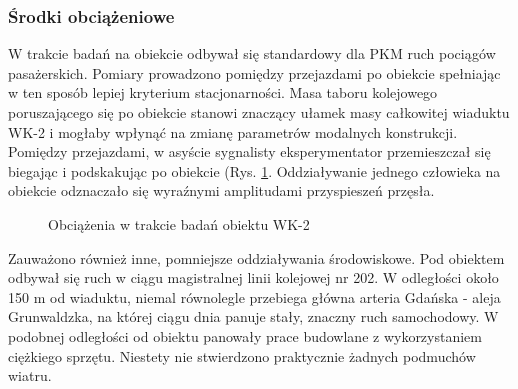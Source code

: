 \subsubsection{Środki obciążeniowe}
W trakcie badań na obiekcie odbywał się standardowy dla PKM ruch pociągów pasażerskich. Pomiary prowadzono pomiędzy przejazdami po obiekcie spełniając w ten sposób lepiej kryterium stacjonarności. Masa taboru kolejowego poruszającego się po obiekcie stanowi znaczący ułamek masy całkowitej wiaduktu WK-2 i mogłaby wpłynąć na zmianę parametrów modalnych konstrukcji. Pomiędzy przejazdami, w asyście sygnalisty eksperymentator przemieszczał się biegając i podskakując po obiekcie (Rys. \ref{fig: wk2_foto_obciazenia}. Oddziaływanie jednego człowieka na obiekcie odznaczało się wyraźnymi amplitudami przyspieszeń przęsła. 
\begin{figure}[hbt!]
	\centering
	 \quad
	\captionsetup{justification=centering}
	\caption{Obciążenia w trakcie badań obiektu WK-2}
	\label{fig: wk2_foto_obciazenia}
\end{figure}

Zauważono również inne, pomniejsze oddziaływania środowiskowe. Pod obiektem odbywał się ruch w ciągu magistralnej linii kolejowej nr 202. W odległości około 150 m od wiaduktu, niemal równolegle przebiega główna arteria Gdańska - aleja Grunwaldzka, na której ciągu dnia panuje stały, znaczny ruch samochodowy. W podobnej odległości od obiektu panowały prace budowlane z wykorzystaniem ciężkiego sprzętu. Niestety nie stwierdzono praktycznie żadnych podmuchów wiatru.



